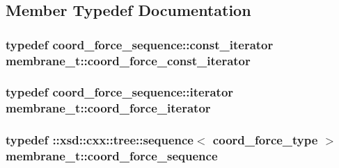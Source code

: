 \subsection{Member Typedef Documentation}
\subsubsection[{\texorpdfstring{coord\+\_\+force\+\_\+const\+\_\+iterator}{coord_force_const_iterator}}]{\setlength{\rightskip}{0pt plus 5cm}typedef coord\+\_\+force\+\_\+sequence\+::const\+\_\+iterator {\bf membrane\+\_\+t\+::coord\+\_\+force\+\_\+const\+\_\+iterator}}\hypertarget{classmembrane__t_a558f9ccc1036a61e199e93fe08646cec}{}\label{classmembrane__t_a558f9ccc1036a61e199e93fe08646cec}
\subsubsection[{\texorpdfstring{coord\+\_\+force\+\_\+iterator}{coord_force_iterator}}]{\setlength{\rightskip}{0pt plus 5cm}typedef coord\+\_\+force\+\_\+sequence\+::iterator {\bf membrane\+\_\+t\+::coord\+\_\+force\+\_\+iterator}}\hypertarget{classmembrane__t_adb487c2f17c0b6197225dbc0beb9990c}{}\label{classmembrane__t_adb487c2f17c0b6197225dbc0beb9990c}
\subsubsection[{\texorpdfstring{coord\+\_\+force\+\_\+sequence}{coord_force_sequence}}]{\setlength{\rightskip}{0pt plus 5cm}typedef \+::xsd\+::cxx\+::tree\+::sequence$<$ {\bf coord\+\_\+force\+\_\+type} $>$ {\bf membrane\+\_\+t\+::coord\+\_\+force\+\_\+sequence}}\hypertarget{classmembrane__t_a2825c9df8bf471f2c5053a826cf6fcb0}{}\label{classmembrane__t_a2825c9df8bf471f2c5053a826cf6fcb0}
